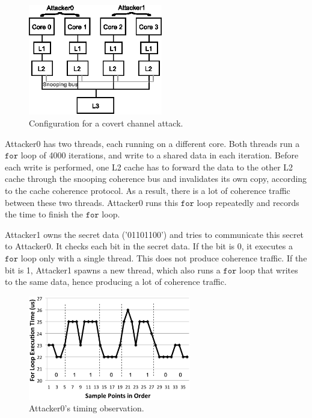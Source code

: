 \begin{figure}
    \begin{center}
        \includegraphics[width=2.3in]{figs/coherent_system.eps}
        \caption{Configuration for a covert channel attack.}
        \label{fig:coherent_system}
    \end{center}
\end{figure}

Attacker0 has two threads, each running on a different core. Both threads run a 
$\mathtt{for }$ loop of 4000 iterations, and
write to a shared data in each iteration. Before each write is performed, one 
L2 cache has to forward the data
to the other L2 cache through the snooping coherence bus and invalidates its own copy, 
according to the cache coherence protocol.  As a result, there is a lot of 
coherence traffic between these two threads. Attacker0 runs this $\mathtt{for }$ loop 
repeatedly and
records the time to finish the $\mathtt{for }$ loop.%

Attacker1 owns the secret data ('01101100') and tries to communicate this 
secret to Attacker0. It checks each bit
in the secret data. If the bit is 0, it executes a $\mathtt{for }$ loop only with a 
single thread.
This does not produce coherence traffic. If the bit is 
1, Attacker1 spawns a new thread, which also runs a $\mathtt{for }$ loop that writes to 
the same data, hence producing a lot of coherence traffic. 

\begin{figure}
    \begin{center}
        \includegraphics[width=2.79in]{figs/coherence_interference.eps}
        \caption{Attacker0's timing observation.}
        \label{fig:coherence_interference}
    \end{center}
\end{figure}

